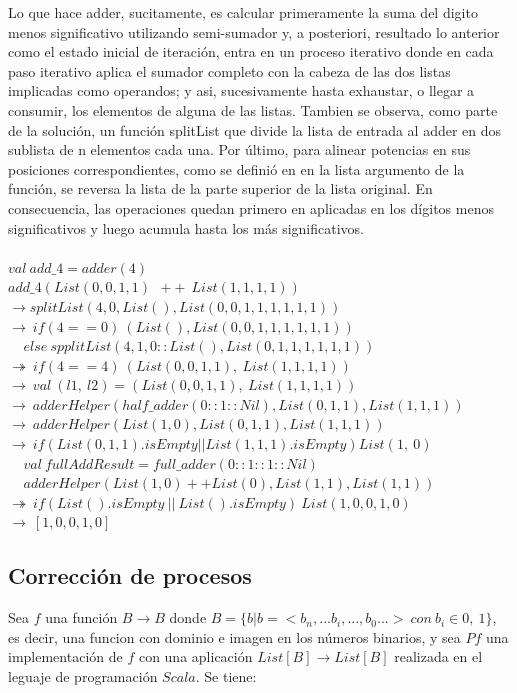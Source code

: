 \documentclass[12pt, a4paper]{article}
\begin{document}
Lo que hace adder, sucitamente, es calcular primeramente la suma del digito menos significativo utilizando semi-sumador y, a posteriori, resultado lo anterior como el estado inicial de iteración, entra en un proceso iterativo donde en cada paso iterativo aplica el sumador completo con la cabeza de las dos listas implicadas como operandos; y asi, sucesivamente hasta exhaustar, o llegar a consumir, los elementos de alguna de las listas. Tambien se observa, como parte de la solución, un función splitList que divide la lista de entrada al adder en dos sublista de n elementos cada una. Por último,  para alinear potencias en sus posiciones correspondientes, como se definió en en la lista argumento de la función, se reversa la lista de la parte superior de la lista original. En consecuencia, las operaciones quedan primero en aplicadas en los dígitos menos significativos y luego acumula hasta los más significativos.\\ \\

$val ~add\_4 = adder(4)$ \\
$add\_4(List(0,0,1,1)~~++~~List(1, 1, 1, 1))$ \\
$\rightarrow splitList(4, 0, List(), List(0,0,1,1,1,1,1,1))$ \\
$\rightarrow~if(4 == 0) ~(List(), List(0,0,1,1,1,1,1,1))$\\
$~~~~~else~spplitList(4, 1, 0::List(), List(0,1,1,1,1,1,1))$ \\
$\twoheadrightarrow~if(4 == 4) ~(List(0,0,1,1), ~List(1,1,1,1))$\\
$\rightarrow~val~(l1,~l2)=(List(0,0,1,1), ~List(1,1,1,1))$ \\
$\rightarrow~adderHelper( half\_adder(0::1::Nil), List(0,1,1), List(1,1,1) )$ \\
$\rightarrow~adderHelper( List(1,0), List(0,1,1), List(1,1,1) )$ \\
$\rightarrow~if( List(0,1,1).isEmpty || List(1,1,1).isEmpty ) List(1,~0)$ \\
$~~~~~val~fullAddResult = full\_adder(0::1::1::Nil)$ \\
$~~~~~adderHelper( List(1, 0) ++ List(0), List(1,1), List(1,1))$ \\
$\twoheadrightarrow~if(List().isEmpty~||~List().isEmpty) ~List(1,0,0,1,0)$\\
$\rightarrow~[1,0,0,1,0]$\\

\subsection{Corrección de procesos}
Sea $f$  una función $B \rightarrow B$ donde $B = \{ b | b = <b_n,... b_i,..., b_0 ...>~con~b_i \in {0,~1}\}$, es decir, una funcion con dominio e imagen en los números binarios, y sea $Pf$ una implementación de $f$ con una aplicación $List[B] \rightarrow List[B]$ realizada en el leguaje de programación $Scala$.  Se tiene:
\end{document}
